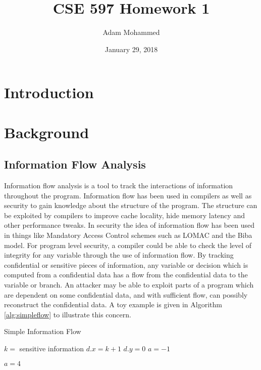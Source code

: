 \documentclass[11pt,a4paper]{article}
\title{CSE 597 Homework 1\vspace{-1ex}}
\author{Adam Mohammed}
\date{\vspace{-1ex}January 29, 2018}
\begin{document}
\section{Introduction}
%
\section{Background}
\subsection{Information Flow Analysis}
  Information flow analysis is a tool to track the interactions of information
  throughout the program. Information flow has been used in compilers as well as
  security to gain knowledge about the structure of the program. The structure
  can be exploited by compilers to improve cache locality, hide memory latency
  and other performance tweaks. In security the idea of information flow has
  been used in things like Mandatory Access Control schemes such as LOMAC and
  the Biba model. For program level security, a compiler could be able to check
  the level of integrity for any variable through the use of information flow.
  By tracking confidential or sensitive pieces of information, any variable or
  decision which is computed from a confidential data has a flow
  from the confidential data to the variable or branch. An attacker may be able
  to exploit parts of a program which are dependent on some confidential data,
  and with sufficient flow, can possibly reconstruct the confidential data. A
  toy example is given in Algorithm \ref{alg:simpleflow} to illustrate this concern.

  \begin{algorithm}
    \caption{Simple Information Flow}
    \label{alg:simpleflow}
  \begin{algorithmic}
    \State $k =$ sensitive information
    \State $d.x =  k + 1$
    \State $d.y = 0$
    \State $a = -1$

      \State $a = 4$ 
    \EndIf

  \end{algorithmic}
  \end{algorithm}
\end{document}

